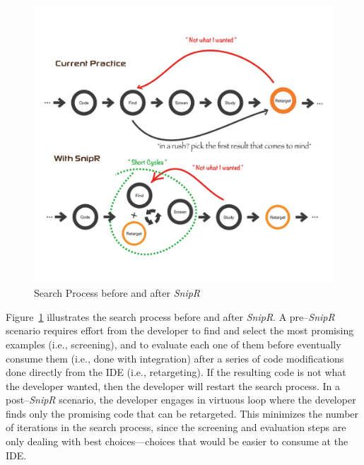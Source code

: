 \begin{figure}[!ht]
    \centering
    \includegraphics[width=\textwidth,height=0.8\textheight,keepaspectratio]{images/searchprocess}
    \caption{Search Process before and after \emph{SnipR}}
    \label{fig:retargeting}
\end{figure}

Figure~\ref{fig:retargeting} illustrates the search process before and after \emph{SnipR}. A pre--\emph{SnipR} scenario requires effort from the developer to find and select the most promising examples (i.e., screening), and to evaluate each one of them before eventually consume them (i.e., done with integration) after a series of code modifications done directly from the IDE (i.e., retargeting). If the resulting code is not what the developer wanted, then the developer will restart the search process. In a post--\emph{SnipR} scenario, the developer engages in virtuous loop where the developer finds only the promising code that can be retargeted. This minimizes the number of iterations in the search process, since the screening and evaluation steps are only dealing with best choices---choices that would be easier to consume at the IDE.


